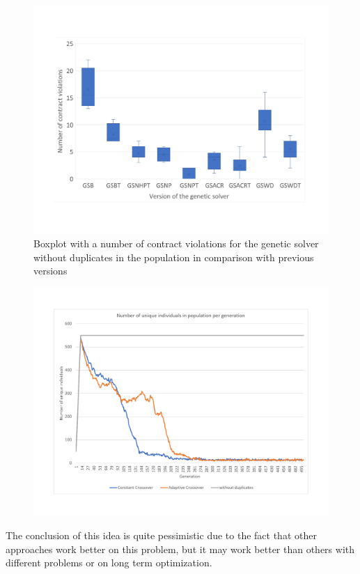 \begin{figure}
	\centering
	\includegraphics[width=\textwidth]{images/BoxPlotSolverNoDuplicates.pdf}
	\caption[Boxplot with a number of contract violations for the genetic solver without duplicates in the population in comparison with previous versions]{Boxplot with a number of contract violations for the genetic solver without duplicates in the population in comparison with previous versions}
	\label{fig:boxplotsolverNoDuplicates}
\end{figure}

\begin{figure}
	\centering
	\includegraphics[width=\textwidth]{images/UniqIndividualsPerGeneration3.pdf}
	\caption[]{}
	\label{fig:UniqIndividualsPerGeneration3}
\end{figure}   

The conclusion of this idea is quite pessimistic due to the fact that other approaches work better on this problem, but it may work better than others with different problems or on long term optimization.


